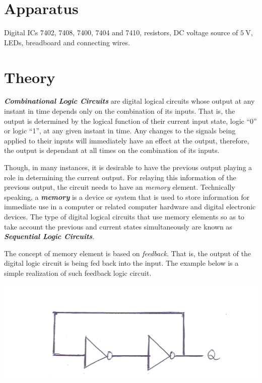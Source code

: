 \section{Apparatus}
\noindent Digital ICs 7402, 7408, 7400, 7404 and 7410, resistors, DC voltage source of $\SI{5}{\volt}$, LEDs, breadboard and connecting wires.
\section{Theory}
\noindent
\textbf{\emph{Combinational Logic Circuits}} are digital logical circuits whose output at any instant in time depends only on the combination of its inputs. That is, the output is determined by the logical function of their current input state, logic “0” or logic “1”, at any given instant in time. Any changes to the signals being applied to their inputs will immediately have an effect at the output, therefore, the output is dependant at all times on the combination of its inputs.
\par
\noindent
Though, in many instances, it is desirable to have the previous output playing a role in determining the current output. For relaying this information of the previous output, the circuit needs to have an \emph{memory} element. Technically speaking, a \textbf{\emph{memory}} is a device or system that is used to store information for immediate use in a computer or related computer hardware and digital electronic devices. The type of digital logical circuits that use memory elements so as to take account the previous and current states simultaneously are known as \textbf{\emph{Sequential Logic Circuits}}.
\par
\noindent
The concept of memory element is based on \emph{feedback}. That is, the output of the digital logic circuit is being fed back into the input. The example below is a simple realization of such feedback logic circuit.
\begin{center}
    \includegraphics[scale = 0.16]{Documents/feedback_1.jpg}
\end{center}
